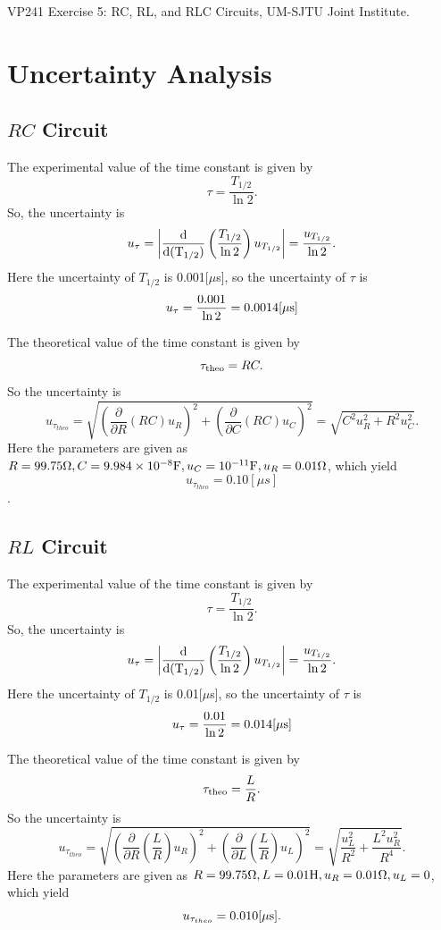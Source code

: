 \documentclass{article}
\begin{document}
\begin{thebibliography}{1}

     VP241 Exercise 5: RC, RL, and RLC Circuits, UM-SJTU Joint Institute.

\end{thebibliography}

\newpage

\appendix

\section{Uncertainty Analysis}

\subsection{$RC$ Circuit}
The experimental value of the time constant is given by 
\[\tau=\frac{T_{1/2}}{\ln 2}.\] 
So, the uncertainty is 
\[u_{\tau}=\left|\frac{\rm d}{\rm d (T_{1/2})}\left(\frac{T_{1/2}}{\ln 2}\right)u_{T_{1/2}}\right|=\frac{u_{T_{1/2}}}{\ln 2}.\] 
Here the uncertainty of $T_{1/2} $ is 0.001$[\mu$s], so the uncertainty of $\tau$ is 
\[u_{\tau}=\frac{0.001}{\ln 2}=0.0014[\mu \rm s]\]

The theoretical value of the time constant is given by 
\[\tau_{\rm theo}=RC.\] 
So the uncertainty is 
\[u_{\tau_{theo}}=\sqrt{\left(\frac{\partial}{\partial R}(RC)u_R\right)^2+\left(\frac{\partial}{\partial C}(RC)u_C\right)^2}=\sqrt{C^2u_R^2+R^2u_C^2}.\] 
Here the parameters are given as \(R=99.75\Omega, C=9.984\times 10^{-8}{\rm F}, u_C=10^{-11}{\rm F}, u_R=0.01\Omega\), which yield
\[u_{\tau_{theo}}=0.10[\mu s]\].

\subsection{$RL$ Circuit}
The experimental value of the time constant is given by 
\[\tau=\frac{T_{1/2}}{\ln 2}.\] 
So, the uncertainty is 
\[u_{\tau}=\left|\frac{\rm d}{\rm d (T_{1/2})}\left(\frac{T_{1/2}}{\ln 2}\right)u_{T_{1/2}}\right|=\frac{u_{T_{1/2}}}{\ln 2}.\] 
Here the uncertainty of $T_{1/2} $ is 0.01$[\mu$s], so the uncertainty of $\tau$ is 
\[u_{\tau}=\frac{0.01}{\ln 2}=0.014[\mu \rm s]\]

The theoretical value of the time constant is given by 
\[\tau_{\rm theo}=\frac{L}{R}.\] 
So the uncertainty is 
\[u_{\tau_{theo}}=\sqrt{\left(\frac{\partial}{\partial R}\left(\frac{L}{R}\right)u_R\right)^2+\left(\frac{\partial}{\partial L}\left(\frac{L}{R}\right)u_L\right)^2}=\sqrt{\frac{u_L^2}{R^2}+\frac{L^2u_R^2}{R^4}}.\] 
Here the parameters are given as \(R=99.75\Omega,L=0.01{\rm H},u_R=0.01\Omega,u_L=0\), which yield
 \[u_{\tau_{theo}}=0.010[\mu \rm s].\]
\end{document}
